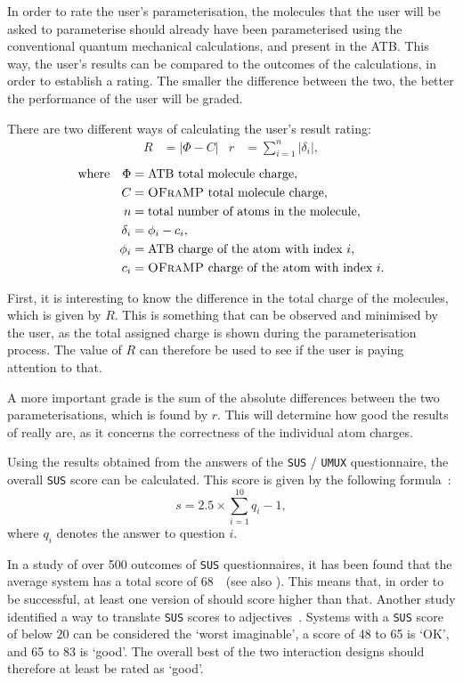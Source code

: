 In order to rate the user's parameterisation, the molecules that the user will be asked to parameterise should already have been parameterised using the conventional quantum mechanical calculations, and present in the ATB. This way, the user's results can be compared to the outcomes of the calculations, in order to establish a rating. The smaller the difference between the two, the better the performance of the user will be graded.

There are two different ways of calculating the user's result rating:
\begin{align*}
R &= |\Phi - C| & r &= \sum_{i = 1}^{n} |\delta_{i}|,
\end{align*}
\vspace{-1em}
\begin{align*}
\text{where} \quad \Phi &= \text{ATB total molecule charge},\\
C &= \text{\textsc{OFraMP}{} total molecule charge},\\
n &= \text{total number of atoms in the molecule},\\
\delta_{i} &= \phi_{i} - c_{i},\\
\phi_{i} &= \text{ATB charge of the atom with index}~i,\\
c_{i} &= \text{\textsc{OFraMP}{} charge of the atom with index}~i.
\end{align*}

First, it is interesting to know the difference in the total charge of the molecules, which is given by $R$. This is something that can be observed and minimised by the user, as the total assigned charge is shown during the parameterisation process. The value of $R$ can therefore be used to see if the user is paying attention to that.

A more important grade is the sum of the absolute differences between the two parameterisations, which is found by $r$. This will determine how good the results of \oframp{} really are, as it concerns the correctness of the individual atom charges.

Using the results obtained from the answers of the \verb|SUS| / \verb|UMUX| questionnaire, the overall \verb|SUS| score can be calculated. This score is given by the following formula~\cite{sauro2011measuring}:
\[
s = 2.5 \times \sum_{i = 1}^{10} q_{i} - 1,
\]
where $q_{i}$ denotes the answer to question $i$.

In a study of over 500 outcomes of \verb|SUS| questionnaires, it has been found that the average system has a total score of $68$~\cite{sauro2011measuring}~(see also ). This means that, in order to be successful, at least one version of \oframp{} should score higher than that. Another study identified a way to translate \verb|SUS| scores to adjectives~\cite{bangor2009determining}. Systems with a \verb|SUS| score of below $20$ can be considered the `worst imaginable', a score of 48 to 65 is `OK', and 65 to 83 is `good'. The overall best of the two interaction designs should therefore at least be rated as `good'.

